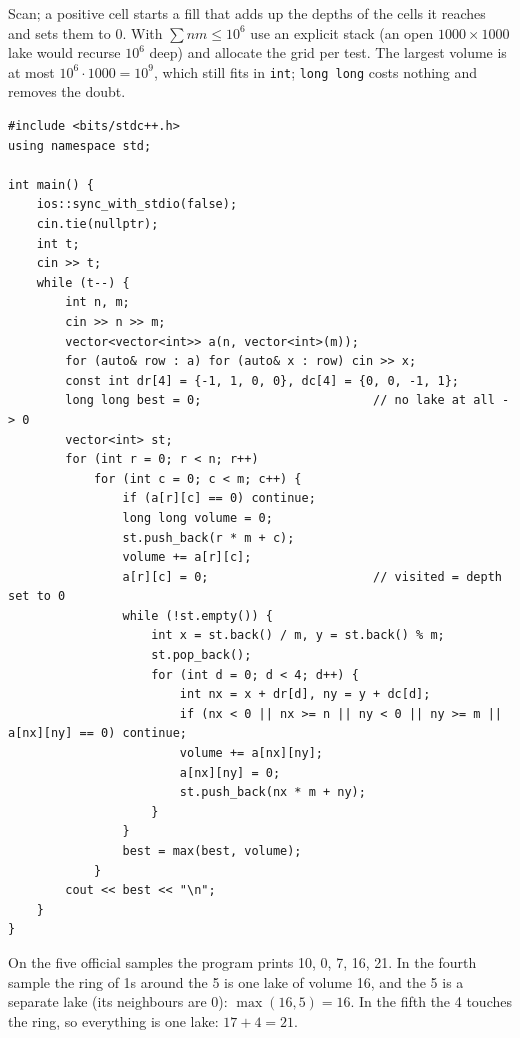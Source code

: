 \begin{solutionbox}
Scan; a positive cell starts a fill that adds up the depths of the cells it reaches and sets them to 0. With $\sum nm \le 10^6$ use an explicit stack (an open $1000\times1000$ lake would recurse $10^6$ deep) and allocate the grid per test. The largest volume is at most $10^6 \cdot 1000 = 10^9$, which still fits in \texttt{int}; \texttt{long long} costs nothing and removes the doubt.
\begin{lstlisting}[style=cpp]
#include <bits/stdc++.h>
using namespace std;

int main() {
    ios::sync_with_stdio(false);
    cin.tie(nullptr);
    int t;
    cin >> t;
    while (t--) {
        int n, m;
        cin >> n >> m;
        vector<vector<int>> a(n, vector<int>(m));
        for (auto& row : a) for (auto& x : row) cin >> x;
        const int dr[4] = {-1, 1, 0, 0}, dc[4] = {0, 0, -1, 1};
        long long best = 0;                        // no lake at all -> 0
        vector<int> st;
        for (int r = 0; r < n; r++)
            for (int c = 0; c < m; c++) {
                if (a[r][c] == 0) continue;
                long long volume = 0;
                st.push_back(r * m + c);
                volume += a[r][c];
                a[r][c] = 0;                       // visited = depth set to 0
                while (!st.empty()) {
                    int x = st.back() / m, y = st.back() % m;
                    st.pop_back();
                    for (int d = 0; d < 4; d++) {
                        int nx = x + dr[d], ny = y + dc[d];
                        if (nx < 0 || nx >= n || ny < 0 || ny >= m || a[nx][ny] == 0) continue;
                        volume += a[nx][ny];
                        a[nx][ny] = 0;
                        st.push_back(nx * m + ny);
                    }
                }
                best = max(best, volume);
            }
        cout << best << "\n";
    }
}
\end{lstlisting}
On the five official samples the program prints 10, 0, 7, 16, 21. In the fourth sample the ring of 1s around the 5 is one lake of volume 16, and the 5 is a separate lake (its neighbours are 0): $\max(16,5) = 16$. In the fifth the 4 touches the ring, so everything is one lake: $17 + 4 = 21$.
\end{solutionbox}

